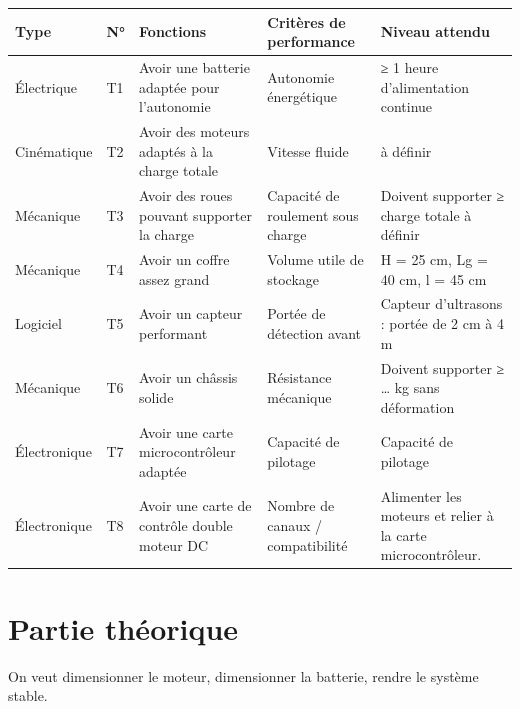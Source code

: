 \documentclass[a4paper,12pt]{report}  %
\begin{document}
{\fontsize{10pt}{12pt}\selectfont 
	\begin{longtable}{|l|l|p{4cm}|p{4cm}|p{4cm}|}
		\hline
		\textbf{Type} & \textbf{N°} & \textbf{Fonctions} 
		& \textbf{Critères de performance} & \textbf{Niveau attendu} \\
		\hline
		\endhead
		
		\hline
		\endfoot
		
		\hline
		Électrique & T1 & Avoir une batterie adaptée pour l'autonomie &
		Autonomie énergétique & ≥ 1 heure d'alimentation continue \\
		
		\hline
		Cinématique & T2 & Avoir des moteurs adaptés à la charge totale &
		Vitesse fluide & à définir \\
		
		\hline
		Mécanique & T3 & Avoir des roues pouvant supporter la charge & Capacité
		de roulement sous charge & Doivent supporter ≥ charge totale à définir \\
		
		\hline
		Mécanique & T4 & Avoir un coffre assez grand & Volume utile de stockage
		& H = 25 cm, Lg = 40 cm, l = 45 cm \\
		
		\hline
		Logiciel & T5 & Avoir un capteur performant & Portée de détection avant
		& Capteur d'ultrasons : portée de 2 cm à 4 m  \\
		
		\hline
		Mécanique & T6 & Avoir un châssis solide & Résistance mécanique &
		Doivent supporter ≥ \ldots{} kg sans déformation \\
		
		\hline
		Électronique & T7 & Avoir une carte microcontrôleur adaptée & Capacité
		de pilotage & Capacité de pilotage \\
		
		\hline
		Électronique & T8 & Avoir une carte de contrôle double moteur DC &
		Nombre de canaux / compatibilité & Alimenter les moteurs et relier à la
		carte microcontrôleur. \\
		
	\end{longtable}
}



\pagebreak
\section{Partie théorique}
On veut dimensionner le moteur, dimensionner la batterie, rendre le système stable. 
\end{document}
